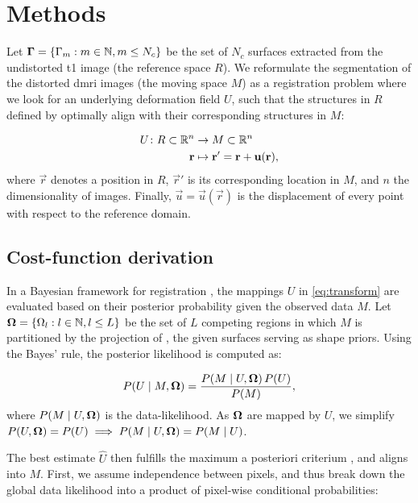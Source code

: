 \section{Methods}
\label{sec:methods}
%
Let $\boldsymbol{\Gamma} = \{\Gamma_m: m \in \mathbb{N}, m \leq N_c\}$ be the set of $N_c$ surfaces
  extracted from the undistorted \gls*{t1} image (the reference space $R$).
We reformulate the segmentation of the distorted \gls*{dmri} images (the moving space $M$)
  as a registration problem where we look for an underlying deformation field $U$, such that 
  the structures in $R$ defined by \gammaset{} optimally align with their corresponding
  structures in $M$:

  \begin{align}
  U\colon R \subset \mathbb{R}^n &\to M \subset \mathbb{R}^n \notag\\
  \vec{r} &\mapsto \vec{r}' =\vec{r}+\vec{u}(\vec{r}),
  \label{eq:transform}
  \end{align}
%
  where $\vec{r}$ denotes a position in $R$, $\vec{r}'$ is
  its corresponding location in $M$, and $n$ the dimensionality of images.
Finally, $\vec{u} = \vec{u}(\vec{r})$ is the displacement of every point with respect
  to the reference domain.

\subsection{Cost-function derivation}\label{sec:methods_map}
%
In a Bayesian framework for registration \citep{wyatt_map_2003,pohl_bayesian_2006,gass_simultaneous_2014},
  the mappings $U$ in \eqref{eq:transform} are
  evaluated based on their posterior probability given the observed data
  $M$.
Let $\boldsymbol{\Omega} = \{\Omega_l: l \in \mathbb{N}, l \leq L\}$ be the set of $L$ competing regions in
  which $M$ is partitioned by the projection of \gammaset, 
  the given surfaces serving as shape priors.
Using the Bayes' rule, the posterior likelihood is computed as:

  \begin{equation}
  P(U \mid M, \omegaset ) = \frac{P(M \mid U,\omegaset )\, P(U)}{P(M)},
  \label{eq:bayes_rule}
  \end{equation}
%
  where $P(M \mid U,\boldsymbol{\Omega})$ is the data-likelihood.
As $\boldsymbol{\Omega}$ are mapped by $U$, we simplify
  $P(U, \boldsymbol{\Omega}) = P(U) \implies P(M \mid U,\boldsymbol{\Omega}) = P(M \mid U)$.

The best estimate $\hat{U}$ then fulfills the maximum a posteriori criterium
  \citep{bishop_pattern_2006}, and aligns \gammaset{} into $M$.
First, we assume independence between pixels, and thus break down the
  global data likelihood into a product of pixel-wise conditional probabilities:

